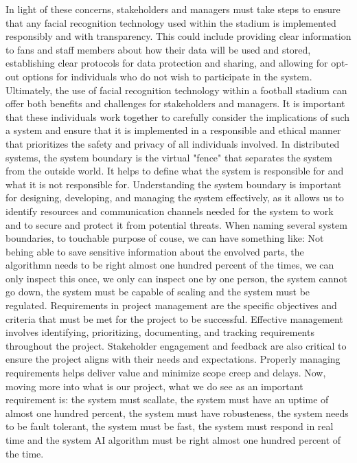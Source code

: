 In light of these concerns, stakeholders and managers must take steps to ensure that any facial recognition technology used within the stadium is implemented responsibly and with transparency. This could include providing clear information to fans and staff members about how their data will be used and stored, establishing clear protocols for data protection and sharing, and allowing for opt-out options for individuals who do not wish to participate in the system.
Ultimately, the use of facial recognition technology within a football stadium can offer both benefits and challenges for stakeholders and managers. It is important that these individuals work together to carefully consider the implications of such a system and ensure that it is implemented in a responsible and ethical manner that prioritizes the safety and privacy of all individuals involved.
In distributed systems, the system boundary is the virtual "fence" that separates the system from the outside world. It helps to define what the system is responsible for and what it is not responsible for. Understanding the system boundary is important for designing, developing, and managing the system effectively, as it allows us to identify resources and communication channels needed for the system to work and to secure and protect it from potential threats.
When naming several system boundaries, to touchable purpose of couse, we can have something like: Not behing able to save sensitive information about the envolved parts, the algorithmn needs to be right almost one hundred percent of the times, we can only inspect this once, we only can inspect one by one person, the system cannot go down, the system must be capable of scaling and the system must be regulated.
Requirements in project management are the specific objectives and criteria that must be met for the project to be successful. Effective management involves identifying, prioritizing, documenting, and tracking requirements throughout the project. Stakeholder engagement and feedback are also critical to ensure the project aligns with their needs and expectations. Properly managing requirements helps deliver value and minimize scope creep and delays. Now, moving more into what is our project, what we do see as an important requirement is: the system must scallate, the system must have an uptime of almost one hundred percent, the system must have robusteness, the system needs to be fault tolerant, the system must be fast, the system must respond in real time and the system AI algorithm must be right almost one hundred percent of the time.